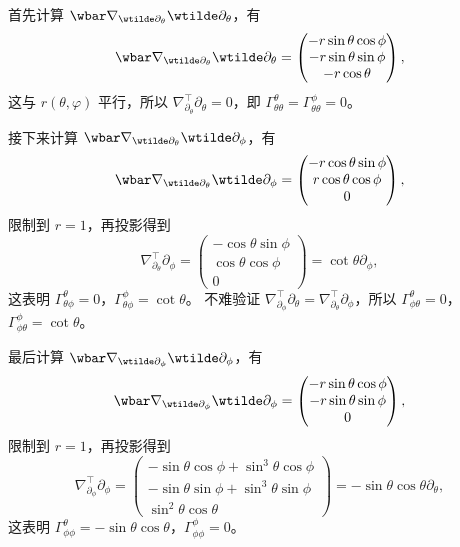 \begin{example}
  首先计算 $\wbar\nabla_{\wtilde\partial_\theta}\wtilde\partial_\theta$，有
  \[
    \wbar\nabla_{\wtilde\partial_\theta}\wtilde\partial_\theta=
    \begin{pmatrix}
      -r\sin\theta\cos\phi \\
      -r\sin\theta\sin\phi \\
      -r\cos\theta
    \end{pmatrix},
  \]
  这与 $r(\theta,\varphi)$ 平行，所以 $\nabla^\top_{\partial_\theta}\partial_\theta=0$，即 $\Gamma_{\theta\theta}^\theta=\Gamma_{\theta\theta}^\phi=0$。

  接下来计算 $\wbar\nabla_{\wtilde\partial_\theta}\wtilde\partial_\phi$，有
  \[
    \wbar\nabla_{\wtilde\partial_\theta}\wtilde\partial_\phi=
    \begin{pmatrix}
      -r\cos\theta\sin\phi \\
      r\cos\theta\cos\phi \\ 
      0
    \end{pmatrix},
  \]
  限制到 $r=1$，再投影得到
  \[
    \nabla^\top_{\partial_\theta}\partial_\phi=\begin{pmatrix}
      -\cos\theta\sin\phi \\
      \cos\theta\cos\phi \\
      0
    \end{pmatrix}=\cot\theta\partial_\phi,
  \]
  这表明 $\Gamma_{\theta\phi}^\theta=0$，$\Gamma_{\theta\phi}^\phi=\cot\theta$。
  不难验证 $\nabla^\top_{\partial_\phi}\partial_\theta=\nabla^\top_{\partial_\theta}\partial_\phi$，所以 $\Gamma_{\phi\theta}^\theta=0$，$\Gamma_{\phi\theta}^\phi=\cot\theta$。

  最后计算 $\wbar\nabla_{\wtilde\partial_\phi}\wtilde\partial_\phi$，有
  \[
    \wbar\nabla_{\wtilde\partial_\phi}\wtilde\partial_\phi=
    \begin{pmatrix}
      -r\sin\theta\cos\phi \\
      -r\sin\theta\sin\phi \\
      0
    \end{pmatrix},
  \]
  限制到 $r=1$，再投影得到
  \[
    \nabla^\top_{\partial_\phi}\partial_\phi=\begin{pmatrix}
      -\sin\theta\cos\phi+\sin^3\theta \cos\phi\\
      -\sin\theta\sin\phi+\sin^3\theta \sin\phi\\
      \sin^2\theta\cos\theta
    \end{pmatrix}=-\sin\theta\cos\theta\partial_\theta,
  \]
  这表明 $\Gamma_{\phi\phi}^\theta=-\sin\theta\cos\theta$，$\Gamma_{\phi\phi}^\phi=0$。
\end{example}

